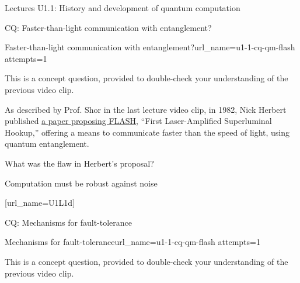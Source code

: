 \begin{edXsection}{Lectures U1.1: History and development of quantum computation}

\begin{edXvertical}{CQ: Faster-than-light communication with entanglement?}

\begin{edXproblem}{Faster-than-light communication with entanglement?}{url_name=u1-1-cq-qm-flash attempts=1}

This is a concept question, provided to double-check your understanding of the previous video clip.

As described by Prof. Shor in the last lecture video clip, in 1982,
Nick Herbert published
\href{https://link.springer.com/article/10.1007\%2FBF00729622}{a paper
  proposing FLASH}, ``First Laser-Amplified Superluminal Hookup,''
offering a means to communicate faster than the speed of light, using
quantum entanglement.

What was the flaw in Herbert's proposal?


\end{edXproblem}


\end{edXvertical}


\begin{edXvertical}{Computation must be robust against noise}

[url_name=U1L1d]


\end{edXvertical}


\begin{edXvertical}{CQ: Mechanisms for fault-tolerance}

\begin{edXproblem}{Mechanisms for fault-tolerance}{url_name=u1-1-cq-qm-flash attempts=1}

This is a concept question, provided to double-check your understanding of the previous video clip.


\end{edXproblem}
\end{edXvertical}
\end{edXsection}
